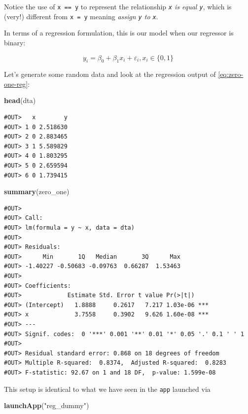 \documentclass[]{book}
\newenvironment{Shaded}{\begin{snugshade}}{\end{snugshade}}
\newcommand{\KeywordTok}[1]{\textcolor[rgb]{0.13,0.29,0.53}{\textbf{#1}}}
\newcommand{\StringTok}[1]{\textcolor[rgb]{0.31,0.60,0.02}{#1}}
\newcommand{\NormalTok}[1]{#1}
\theoremstyle{definition}
\theoremstyle{definition}
\theoremstyle{definition}
\theoremstyle{remark}
\begin{document}
Notice the use of \texttt{x\ ==\ y} to represent the relationship
\emph{\texttt{x} is equal \texttt{y}}, which is (very!) different from
\texttt{x\ =\ y} meaning \emph{assign \texttt{y} to \texttt{x}}.

In terms of a regression formulation, this is our model when our
regressor is binary:

\[
y_i = \beta_0 + \beta_1 x_i + \varepsilon_i,x_i\in\{0,1\} \label{eq:zero-one-reg}
\]

Let's generate some random data and look at the regression output of
\eqref{eq:zero-one-reg}:

\begin{Shaded}
\begin{Highlighting}[]
\KeywordTok{head}\NormalTok{(dta)}
\end{Highlighting}
\end{Shaded}

\begin{verbatim}
#OUT>   x        y
#OUT> 1 0 2.518630
#OUT> 2 0 2.883465
#OUT> 3 1 5.589829
#OUT> 4 0 1.803295
#OUT> 5 0 2.659594
#OUT> 6 0 1.739415
\end{verbatim}

\begin{Shaded}
\begin{Highlighting}[]
\KeywordTok{summary}\NormalTok{(zero_one)}
\end{Highlighting}
\end{Shaded}

\begin{verbatim}
#OUT> 
#OUT> Call:
#OUT> lm(formula = y ~ x, data = dta)
#OUT> 
#OUT> Residuals:
#OUT>      Min       1Q   Median       3Q      Max 
#OUT> -1.40227 -0.50683 -0.09763  0.66287  1.53463 
#OUT> 
#OUT> Coefficients:
#OUT>             Estimate Std. Error t value Pr(>|t|)    
#OUT> (Intercept)   1.8888     0.2617   7.217 1.03e-06 ***
#OUT> x             3.7558     0.3902   9.626 1.60e-08 ***
#OUT> ---
#OUT> Signif. codes:  0 '***' 0.001 '**' 0.01 '*' 0.05 '.' 0.1 ' ' 1
#OUT> 
#OUT> Residual standard error: 0.868 on 18 degrees of freedom
#OUT> Multiple R-squared:  0.8374,  Adjusted R-squared:  0.8283 
#OUT> F-statistic: 92.67 on 1 and 18 DF,  p-value: 1.599e-08
\end{verbatim}

This setup is identical to what we have seen in the \texttt{app}
launched via

\begin{Shaded}
\begin{Highlighting}[]
\KeywordTok{launchApp}\NormalTok{(}\StringTok{"reg_dummy"}\NormalTok{)}
\end{Highlighting}
\end{Shaded}
\end{document}
